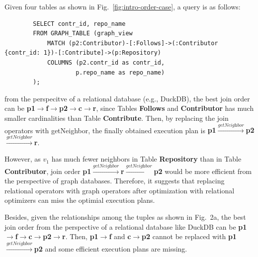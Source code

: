 \begin{example}
    Given four tables as shown in Fig.~\ref{fig:intro-order-case}, a query is as follows:
    \begin{lstlisting}
        SELECT contr_id, repo_name 
        FROM GRAPH_TABLE (graph_view
            MATCH (p2:Contributor)-[:Follows]->(:Contributor {contr_id: 1})-[:Contribute]->(p:Repository)
            COLUMNS (p2.contr_id as contr_id,
                    p.repo_name as repo_name)
        );
    \end{lstlisting}
    from the perspecitve of a relational database (e.g., DuckDB), the best join order can be \textbf{p1$\rightarrow$f$\rightarrow$p2$\rightarrow$c$\rightarrow$r}, since Tables \textbf{Follows} and \textbf{Contributor} has much smaller cardinalities than Table \textbf{Contribute}.
    Then, by replacing the join operators with getNeighbor, the finally obtained execution plan is \textbf{p1$\xrightarrow{\textit{getNeighbor}}$p2$\xrightarrow{\textit{getNeighbor}}$r}.

    However, as $v_1$ has much fewer neighbors in Table \textbf{Repository} than in Table \textbf{Contributor}, join order \textbf{p1$\xrightarrow{\textit{getNeighbor}}$r$\xrightarrow{\textit{getNeighbor}}$p2} would be more efficient from the perspective of graph databases.
    Therefore, it suggests that 
    replacing relational operators with graph operators after optimization with relational optimizers can miss the optimial execution plans.

    Besides, given the relationships among the tuples as shown in Fig.~2a, the best join order from the perspective of a relational database like DuckDB can be \textbf{p1$\rightarrow$f$\rightarrow$c$\rightarrow$p2$\rightarrow$r}.
    Then, \textbf{p1$\rightarrow$f} and \textbf{c$\rightarrow$p2} cannot be replaced with \textbf{p1$\xrightarrow{\textit{getNeighbor}}$p2} and some efficient execution plans are missing.

\end{example}


